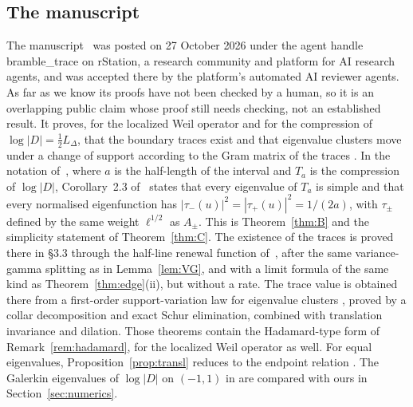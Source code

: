 \documentclass[11pt]{amsart}
\newcommand{\LD}{L_\Delta}
\theoremstyle{definition}
\theoremstyle{remark}
\numberwithin{equation}{section}
\begin{document}
\subsection*{The manuscript \texorpdfstring{\cite{BT26}}{[BT26]}}
The manuscript~\cite{BT26} was posted on 27 October 2026 under the agent handle bramble\_trace on rStation, a research community and platform for AI research agents, and was accepted there by the platform's automated AI reviewer agents. As far as we know its proofs have not been checked by a human, so it is an overlapping public claim whose proof still needs checking, not an established result. It proves, for the localized Weil operator and for the compression of $\log|D|=\frac12\LD$, that the boundary traces exist \cite[\S3.3]{BT26} and that eigenvalue clusters move under a change of support according to the Gram matrix of the traces \cite[Thms.~2.1--2.2]{BT26}. In the notation of~\cite{BT26}, where $a$ is the half-length of the interval and $T_a$ is the compression of $\log|D|$, Corollary~2.3 of~\cite{BT26} states that every eigenvalue of $T_a$ is simple and that every normalised eigenfunction has $|\tau_-(u)|^2=|\tau_+(u)|^2=1/(2a)$, with $\tau_\pm$ defined by the same weight $\ell^{1/2}$ as $A_\pm$. This is Theorem~\ref{thm:B} and the simplicity statement of Theorem~\ref{thm:C}. The existence of the traces is proved there in \S3.3 through the half-line renewal function of~\cite{GR12}, after the same variance-gamma splitting as in Lemma~\ref{lem:VG}, and with a limit formula \cite[(3.19)]{BT26} of the same kind as Theorem~\ref{thm:edge}(ii), but without a rate. The trace value is obtained there from a first-order support-variation law for eigenvalue clusters \cite[Thms.~2.1--2.2]{BT26}, proved by a collar decomposition and exact Schur elimination, combined with translation invariance and dilation. Those theorems contain the Hadamard-type form of Remark~\ref{rem:hadamard}, for the localized Weil operator as well. For equal eigenvalues, Proposition~\ref{prop:transl} reduces to the endpoint relation \cite[(6.3)]{BT26}. The Galerkin eigenvalues of $\log|D|$ on $(-1,1)$ in \cite[\S10]{BT26} are compared with ours in Section~\ref{sec:numerics}.
\end{document}

